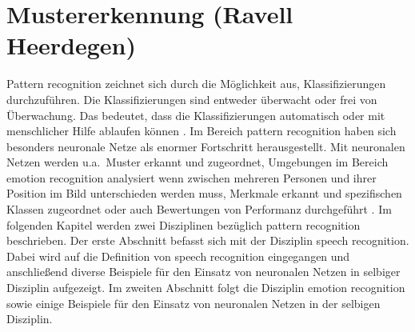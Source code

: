 \section{Mustererkennung (Ravell Heerdegen)} \label{Mustererkennung}
Pattern recognition zeichnet sich durch die Möglichkeit aus, Klassifizierungen durchzuführen. Die Klassifizierungen sind entweder überwacht oder frei von Überwachung. Das bedeutet, dass die Klassifizierungen automatisch oder mit menschlicher Hilfe ablaufen können \cite{svmgmm}. Im Bereich pattern recognition haben sich besonders neuronale Netze als enormer Fortschritt herausgestellt. Mit neuronalen Netzen werden u.a.~Muster erkannt und zugeordnet, Umgebungen im Bereich emotion recognition analysiert wenn zwischen mehreren Personen und ihrer Position im Bild unterschieden werden muss, Merkmale erkannt und spezifischen Klassen zugeordnet oder auch Bewertungen von Performanz durchgeführt \cite{patternrec}.
Im folgenden Kapitel werden zwei Disziplinen bezüglich pattern recognition beschrieben. Der erste Abschnitt befasst sich mit der Disziplin speech recognition. Dabei wird auf die Definition von speech recognition eingegangen und anschließend diverse Beispiele für den Einsatz von neuronalen Netzen in selbiger Disziplin aufgezeigt.
Im zweiten Abschnitt folgt die Disziplin emotion recognition sowie einige Beispiele für den Einsatz von neuronalen Netzen in der selbigen Disziplin.


